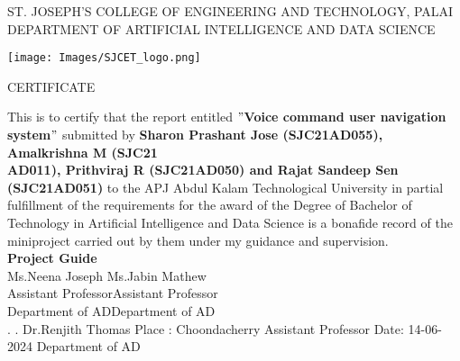 \newpage
\thispagestyle{empty}
\begin{center}
\normalsize{ST. JOSEPH’S COLLEGE OF ENGINEERING AND TECHNOLOGY, PALAI}\\[0.5cm]
\normalsize
 { DEPARTMENT OF ARTIFICIAL INTELLIGENCE AND DATA SCIENCE}\\[1.0cm]%
   \begin{center}
   \texttt{[image: Images/SJCET\_logo.png]}
   \end{center}
{\large CERTIFICATE}\\[1.5cm]
\end{center}
\normalsize 
This is to certify that the report entitled {\bf $"$Voice command user navigation system$"$} submitted by { \bf Sharon Prashant Jose (SJC21AD055), Amalkrishna M (SJC21\\AD011), Prithviraj R (SJC21AD050) and Rajat Sandeep Sen (SJC21AD051)} to the APJ Abdul Kalam Technological University in partial fulfillment of the requirements for the award of the Degree of Bachelor of Technology in Artificial Intelligence and Data Science is a bonafide record of the miniproject carried out by them under my guidance and supervision.\vspace{1.2 cm}\\
{\bf Project Guide}\hspace{8.35 cm}{\bf Project Coordinator}\\
Ms.Neena Joseph\hspace{8.0 cm} Ms.Jabin Mathew\\
Assistant Professor\hspace{7.76 cm}Assistant Professor\hspace{2.7 cm}\\Department of AD\hspace{7.8 cm}Department of AD
\vspace{1.0 cm}\\
.\hspace{11.06 cm}{\bf Head of the Department}
\newline
.\hspace{11.01 cm} Dr.Renjith Thomas
\newline
Place : Choondacherry  \hspace{6.87 cm} Assistant Professor
\newline
Date\hspace{0.25 cm}: 14-06-2024 \hspace{7.7 cm} Department of AD
                
